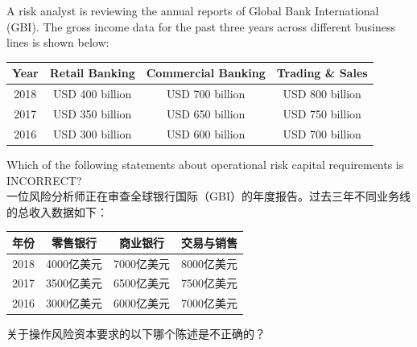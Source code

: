 \documentclass{article}
\newcounter{question} %
\begin{document}
    \begin{question}
        A risk analyst is reviewing the annual reports of Global Bank International (GBI). The gross income data for the past three years across different business lines is shown below:
    
        \begin{center}
        \begin{tabular}{|c|c|c|c|}
        \hline
        Year & Retail Banking & Commercial Banking & Trading \& Sales \\
        \hline
        2018 & USD 400 billion & USD 700 billion & USD 800 billion \\
        \hline
        2017 & USD 350 billion & USD 650 billion & USD 750 billion \\
        \hline
        2016 & USD 300 billion & USD 600 billion & USD 700 billion \\
        \hline
        \end{tabular}
        \end{center}
    
        Which of the following statements about operational risk capital requirements is INCORRECT?
        \\一位风险分析师正在审查全球银行国际（GBI）的年度报告。过去三年不同业务线的总收入数据如下：
    
        \begin{center}
        \begin{tabular}{|c|c|c|c|}
        \hline
        年份 & 零售银行 & 商业银行 & 交易与销售 \\
        \hline
        2018 & 4000亿美元 & 7000亿美元 & 8000亿美元 \\
        \hline
        2017 & 3500亿美元 & 6500亿美元 & 7500亿美元 \\
        \hline
        2016 & 3000亿美元 & 6000亿美元 & 7000亿美元 \\
        \hline
        \end{tabular}
        \end{center}
    
        关于操作风险资本要求的以下哪个陈述是不正确的？
    \end{question}
    
\end{document}
